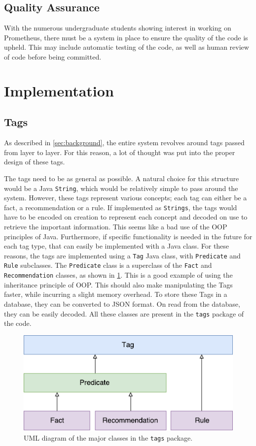 \documentclass[titlepage,11pt]{article}
\newcommand{\code}[1]{\texttt{#1}}
\begin{document}
\subsection{Quality Assurance}
With the numerous undergraduate students showing interest in working on Prometheus, there must be a system in place to ensure the quality of the code is upheld. This may include automatic testing of the code, as well as human review of code before being committed.

\section{Implementation}
\label{sec:implementation}

\subsection{Tags}

As described in \autoref{sec:background}, the entire system revolves around tags passed from layer to layer. For this reason, a lot of thought was put into the proper design of these tags.

The tags need to be as general as possible. A natural choice for this structure would be a Java \code{String}, which would be relatively simple to pass around the system. However, these tags represent various concepts; each tag can either be a fact, a recommendation or a rule. If implemented as \code{Strings}, the tags would have to be encoded on creation to represent each concept and decoded on use to retrieve the important information. This seems like a bad use of the OOP principles of Java. Furthermore, if specific functionality is needed in the future for each tag type, that can easily be implemented with a Java class. For these reasons, the tags are implemented using a \code{Tag} Java class, with \code{Predicate} and \code{Rule} subclasses. The \code{Predicate} class is a superclass of the \code{Fact} and \code{Recommendation} classes, as shown in \cref{fig:uml_tags}. This is a good example of using the inheritance principle of OOP. This should also make manipulating the Tags faster, while incurring a slight memory overhead. To store these Tags in a database, they can be converted to JSON format. On read from the database, they can be easily decoded. All these classes are present in the \code{tags} package of the code.

\begin{figure}[!htb]
	\includegraphics[width=\columnwidth]{figures/uml_tags.pdf}
	\caption{UML diagram of the major classes in the \code{tags} package.}
	\label{fig:uml_tags}
\end{figure}
\end{document}
